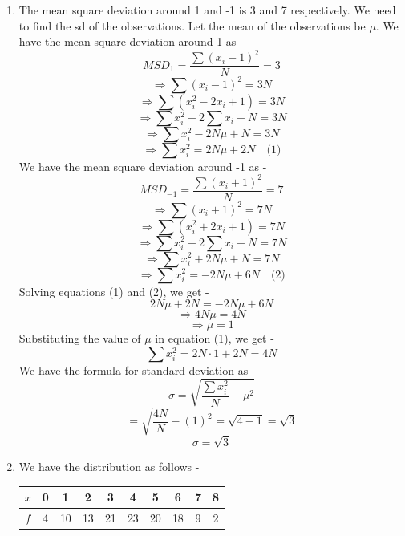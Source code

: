 \begin{enumerate}
    where $f_i$ is the frequency of class $i$, $x_i$ is the mid-point of class $i$ and $N$ is the total number of observations. \\
    For the initial variance of 90, we have -
    \[90 = \frac{\sum f_i x_i^2}{40} - (40)^2\] 
    \[\Rightarrow \sum f_i x_i^2 = (90 + 1600) \cdot 40 =  67600 \quad \text{(2)}\]
    For the corrected variance, we have -
    \[\sigma^2 = \frac{\sum f_i x_i^2 - 2 \cdot 25^2 + 2 \cdot 35^2}{40} - (40.5)^2\]
    \[\Rightarrow \sigma^2 = \frac{67600 - 1250 + 2450}{40} - 1640.25\]
    \[\Rightarrow \sigma^2 = \frac{68800}{40} - 1640.25 = 1720 - 1640.25 = 79.75\]
    \[\boxed{\text{Correct Variance} = 79.75
    }\]
    \item The mean square deviation around 1 and -1 is 3 and 7 respectively. We need to find the sd of the observations. 
    Let the mean of the observations be $\mu$. We have the mean square deviation around 1 as -
    \[MSD_1 = \frac{\sum (x_i - 1)^2}{N} = 3\]
    \[\Rightarrow \sum (x_i - 1)^2 = 3N\]
    \[\Rightarrow \sum (x_i^2 - 2x_i + 1) = 3N\]
    \[\Rightarrow \sum x_i^2 - 2 \sum x_i + N = 3N\]
    \[\Rightarrow \sum x_i^2 - 2N\mu + N = 3N\]
    \[\Rightarrow \sum x_i^2 = 2N\mu + 2N \quad \text{(1)}\]
    We have the mean square deviation around -1 as -
    \[MSD_{-1} = \frac{\sum (x_i + 1)^2}{N} = 7\]
    \[\Rightarrow \sum (x_i + 1)^2 = 7N\]
    \[\Rightarrow \sum (x_i^2 + 2x_i + 1) = 7N\]
    \[\Rightarrow \sum x_i^2 + 2 \sum x_i + N = 7N\]
    \[\Rightarrow \sum x_i^2 + 2N\mu + N = 7N\]
    \[\Rightarrow \sum x_i^2 = -2N\mu + 6N \quad \text{(2)}\]
    Solving equations (1) and (2), we get -
    \[2N\mu + 2N = -2N\mu + 6N\]
    \[\Rightarrow 4N\mu = 4N\]
    \[\Rightarrow \mu = 1\]
    Substituting the value of $\mu$ in equation (1), we get -
    \[\sum x_i^2 = 2N \cdot 1 + 2N = 4N\]
    We have the formula for standard deviation as -
    \[\sigma = \sqrt{\frac{\sum x_i^2}{N} - \mu^2}\]
    \[= \sqrt{\frac{4N}{N} - (1)^2} = \sqrt{4 - 1} = \sqrt{3}\]
    \[\boxed{\sigma = \sqrt{3}
    }\]
    \item We have the distribution as follows - 
    \begin{center}
        \begin{tabular}{|c|ccccccccc|}
            \hline
            $x$ & 0 & 1 & 2 & 3 & 4 & 5 & 6 & 7 & 8 \\
            \hline
            $f$ & 4 & 10 & 13 & 21 & 23 & 20 & 18 & 9 & 2 \\
            \hline
        \end{tabular}
    \end{center}

\end{enumerate}
